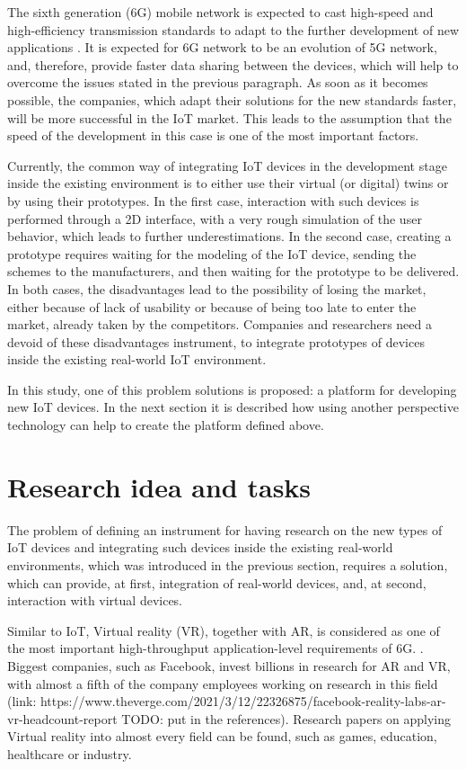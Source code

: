 The sixth generation (6G) mobile network is expected to cast high-speed and high-efficiency transmission standards to adapt to the further development of new applications \cite{liao_information-centric_2021} \cite{huang_survey_2019}. It is expected for 6G network to be an evolution of 5G network, and, therefore, provide faster data sharing between the devices, which will help to overcome the issues stated in the previous paragraph. As soon as it becomes possible, the companies, which adapt their solutions for the new standards faster, will be more successful in the IoT market. This leads to the assumption that the speed of the development in this case is one of the most important factors.

Currently, the common way of integrating IoT devices in the development stage inside the existing environment is to either use their virtual (or digital) twins or by using their prototypes. In the first case, interaction with such devices is performed through a 2D interface, with a very rough simulation of the user behavior, which leads to further underestimations. In the second case, creating a prototype requires waiting for the modeling of the IoT device, sending the schemes to the manufacturers, and then waiting for the prototype to be delivered. In both cases, the disadvantages lead to the possibility of losing the market, either because of lack of usability or because of being too late to enter the market, already taken by the competitors. Companies and researchers need a devoid of these disadvantages instrument, to integrate prototypes of devices inside the existing real-world IoT environment.

In this study, one of this problem solutions is proposed: a platform for developing new IoT devices. In the next section it is described how using another perspective technology can help to create the platform defined above.

\section{Research idea and tasks}

The problem of defining an instrument for having research on the new types of IoT devices and integrating such devices inside the existing real-world environments, which was introduced in the previous section, requires a solution, which can provide, at first, integration of real-world devices, and, at second, interaction with virtual devices.

Similar to IoT, Virtual reality (VR), together with AR, is considered as one of the most important high-throughput application-level requirements of 6G. . Biggest companies, such as Facebook, invest billions in research for AR and VR, with almost a fifth of the company employees working on research in this field (link: https://www.theverge.com/2021/3/12/22326875/facebook-reality-labs-ar-vr-headcount-report TODO: put in the references). Research papers on applying Virtual reality into almost every field can be found, such as games, education, healthcare or industry.

